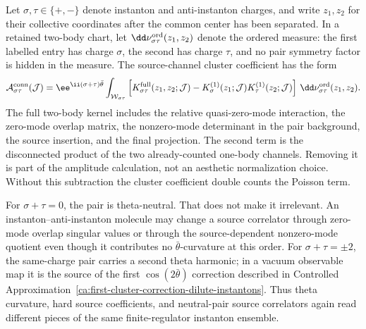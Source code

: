 Let \(\sigma,\tau\in\{+,-\}\) denote instanton and anti-instanton charges,
and write \(z_1,z_2\) for their collective coordinates after the common
center has been separated.  In a retained two-body chart, let
\(\dd\nu_{\sigma\tau}^{\rm ord}(z_1,z_2)\) denote the ordered measure: the
first labelled entry has charge \(\sigma\), the second has charge \(\tau\),
and no pair symmetry factor is hidden in the measure.  The source-channel
cluster coefficient has the form
\begin{equation}
  \mathcal A_{\sigma\tau}^{\rm conn}(\mathcal J)
  =
  \ee^{\ii(\sigma+\tau)\bar\theta}
  \int_{\mathcal W_{\sigma\tau}}
  \left[
    K_{\sigma\tau}^{\rm full}(z_1,z_2;\mathcal J)
    -
    K_{\sigma}^{(1)}(z_1;\mathcal J)
    K_{\tau}^{(1)}(z_2;\mathcal J)
  \right]\,
  \dd\nu_{\sigma\tau}^{\rm ord}(z_1,z_2).
  \label{eq:instanton-pair-connected-source-coefficient}
\end{equation}
The full two-body kernel includes the relative quasi-zero-mode interaction,
the zero-mode overlap matrix, the nonzero-mode determinant in the pair
background, the source insertion, and the final projection.  The second term
is the disconnected product of the two already-counted one-body channels.
Removing it is part of the amplitude calculation, not an aesthetic
normalization choice.  Without this subtraction the cluster coefficient
double counts the Poisson term.

For \(\sigma+\tau=0\), the pair is theta-neutral.  That does not make it
irrelevant.  An instanton--anti-instanton molecule may change a source
correlator through zero-mode overlap singular values or through the
source-dependent nonzero-mode quotient even though it contributes no
\(\bar\theta\)-curvature at this order.  For \(\sigma+\tau=\pm2\), the
same-charge pair carries a second theta harmonic; in a vacuum observable map
it is the source of the first \(\cos(2\bar\theta)\) correction described in
Controlled Approximation~\ref{ca:first-cluster-correction-dilute-instantons}.
Thus theta curvature, hard source coefficients, and neutral-pair source
correlators again read different pieces of the same finite-regulator
instanton ensemble.

